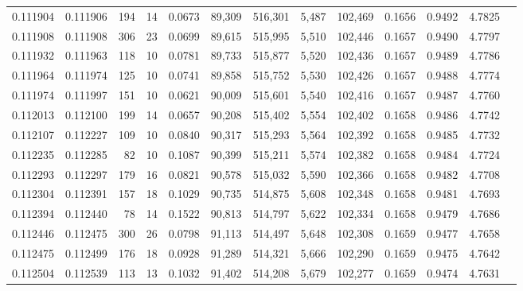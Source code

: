 \begin{tabular}{rrrrrrrrrrrrr}
0.111904 & 0.111906 &   194 &  14 &                                     0.0673 &  89,309 & 516,301 &   5,487 & 102,469 & 0.1656 & 0.9492 & 4.7825 \\
0.111908 & 0.111908 &   306 &  23 &                                     0.0699 &  89,615 & 515,995 &   5,510 & 102,446 & 0.1657 & 0.9490 & 4.7797 \\
0.111932 & 0.111963 &   118 &  10 &                                     0.0781 &  89,733 & 515,877 &   5,520 & 102,436 & 0.1657 & 0.9489 & 4.7786 \\
0.111964 & 0.111974 &   125 &  10 &                                     0.0741 &  89,858 & 515,752 &   5,530 & 102,426 & 0.1657 & 0.9488 & 4.7774 \\
0.111974 & 0.111997 &   151 &  10 &                                     0.0621 &  90,009 & 515,601 &   5,540 & 102,416 & 0.1657 & 0.9487 & 4.7760 \\
0.112013 & 0.112100 &   199 &  14 &                                     0.0657 &  90,208 & 515,402 &   5,554 & 102,402 & 0.1658 & 0.9486 & 4.7742 \\
0.112107 & 0.112227 &   109 &  10 &                                     0.0840 &  90,317 & 515,293 &   5,564 & 102,392 & 0.1658 & 0.9485 & 4.7732 \\
0.112235 & 0.112285 &    82 &  10 &                                     0.1087 &  90,399 & 515,211 &   5,574 & 102,382 & 0.1658 & 0.9484 & 4.7724 \\
0.112293 & 0.112297 &   179 &  16 &                                     0.0821 &  90,578 & 515,032 &   5,590 & 102,366 & 0.1658 & 0.9482 & 4.7708 \\
0.112304 & 0.112391 &   157 &  18 &                                     0.1029 &  90,735 & 514,875 &   5,608 & 102,348 & 0.1658 & 0.9481 & 4.7693 \\
0.112394 & 0.112440 &    78 &  14 &                                     0.1522 &  90,813 & 514,797 &   5,622 & 102,334 & 0.1658 & 0.9479 & 4.7686 \\
0.112446 & 0.112475 &   300 &  26 &                                     0.0798 &  91,113 & 514,497 &   5,648 & 102,308 & 0.1659 & 0.9477 & 4.7658 \\
0.112475 & 0.112499 &   176 &  18 &                                     0.0928 &  91,289 & 514,321 &   5,666 & 102,290 & 0.1659 & 0.9475 & 4.7642 \\
0.112504 & 0.112539 &   113 &  13 &                                     0.1032 &  91,402 & 514,208 &   5,679 & 102,277 & 0.1659 & 0.9474 & 4.7631 \\

\end{tabular}
